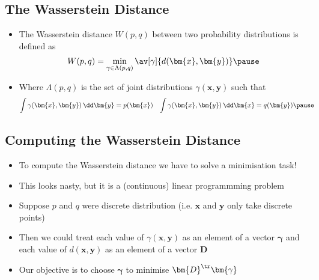 \begin{slide}
\section{The Wasserstein Distance}

\begin{PauseHighLight}
  \begin{itemize}
  \item The Wasserstein distance $W(p,q)$ between two probability
    distributions is defined as
    \begin{align*}
      W(p,q) = \min_{\gamma \in \Lambda(p,q)}
      \av[\gamma]{d(\bm{x},\bm{y})}\pause
    \end{align*}
  \item Where $\Lambda(p,q)$ is the set of joint distributions
    $\gamma(\bm{x},\bm{y})$ such that
    \begin{align*}
      \int \gamma(\bm{x},\bm{y}) \, \dd \bm{y} &= p(\bm{x}) &
      \int \gamma(\bm{x},\bm{y}) \, \dd \bm{x} &= q(\bm{y})\pause
    \end{align*}
  \end{itemize}
\end{PauseHighLight}

\end{slide}


\begin{slide}
\section[-1]{Computing the Wasserstein Distance}

\begin{PauseHighLight}
  \begin{itemize}
  \item To compute the Wasserstein distance we have to solve a
    minimisation task!\pause
  \item This looks nasty, but it is a (continuous) linear programmming
    problem\pause
  \item Suppose $p$ and $q$ were discrete distribution (i.e. $\bm{x}$
    and $\bm{y}$ only take discrete points)\pause
  \item Then we could treat each value of $\gamma(\bm{x},\bm{y})$ as
    an element of a vector $\bm{\gamma}$ and each value of
    $d(\bm{x},\bm{y})$ as an element of a vector $\bm{D}$\pause
  \item Our objective is to choose $\bm{\gamma}$ to minimise
    $\bm{D}^\tr\bm{\gamma}$\pause
  \end{itemize}
\end{PauseHighLight}

\end{slide}

